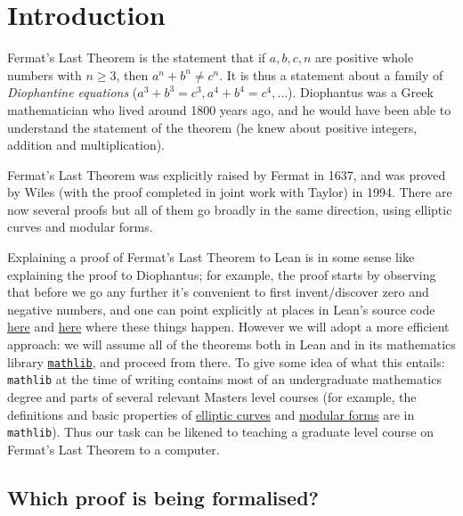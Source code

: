 \chapter{Introduction}

Fermat's Last Theorem is the statement that if $a,b,c,n$ are positive whole numbers with $n\geq 3$,
then $a^n+b^n\not=c^n$. It is thus a statement about a family of \emph{Diophantine equations}
($a^3+b^3=c^3, a^4+b^4=c^4,\ldots$). Diophantus was a Greek mathematician who lived around 1800
years ago, and he would have been able to understand the statement of the theorem (he knew about
positive integers, addition and multiplication).

Fermat's Last Theorem was explicitly raised by Fermat in 1637, and was proved by Wiles (with the
proof completed in joint work with Taylor) in 1994. There are now several proofs but all of them
go broadly in the same direction, using elliptic curves and modular forms.

Explaining a proof of Fermat's Last Theorem to Lean is in some sense like explaining the proof to
Diophantus; for example, the proof starts by observing that before we go any further it's convenient
to first invent/discover zero and negative numbers, and one can point explicitly at places in Lean's
source code \href{https://github.com/leanprover/lean4/blob/260eaebf4e804c9ac1319532970544a4e157c336/src/Init/Prelude.lean#L1049}{here}
and \href{https://github.com/leanprover/lean4/blob/260eaebf4e804c9ac1319532970544a4e157c336/src/Init/Data/Int/Basic.lean#L45}{here}
where these things happen. However we will adopt a more efficient approach: we will assume all of
the theorems both in Lean and in its mathematics library
\href{https://github.com/leanprover-community/mathlib4}{\tt mathlib}, and proceed from there.
To give some idea of what this entails: {\tt mathlib} at the time of writing contains most of an
undergraduate mathematics degree and parts of several relevant Masters level courses (for example,
the definitions and basic properties of
\href{https://leanprover-community.github.io/mathlib4_docs/Mathlib/AlgebraicGeometry/EllipticCurve/Weierstrass.html}{elliptic curves}
and \href{https://leanprover-community.github.io/mathlib4_docs/Mathlib/NumberTheory/ModularForms/Basic.html}{modular forms}
are in {\tt mathlib}). Thus our task can be likened to teaching a graduate level course on
Fermat's Last Theorem to a computer.

\section{Which proof is being formalised?}

